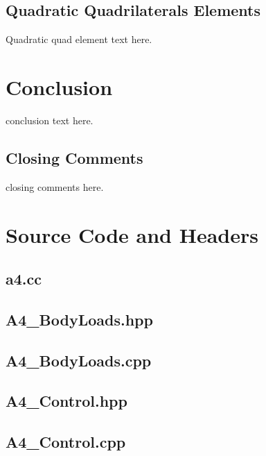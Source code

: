 \documentclass[a4paper, 12pt]{article}
\begin{document}
\subsection{Quadratic Quadrilaterals Elements} \label{subsec:quadQuads}
Quadratic quad element text here.

\section{Conclusion} \label{sec:conclusion}
conclusion text here.

\subsection{Closing Comments} \label{sec:comments}
closing comments here.

\newpage
\appendix
\section{Source Code and Headers} \label{sec:code}

\newpage
\subsection{a4.cc} \label{subsec:a4.cc}


\newpage
\subsection{A4\_BodyLoads.hpp} \label{subsec:BLhpp}


\newpage
\subsection{A4\_BodyLoads.cpp} \label{subsec:BLcpp}


\newpage
\subsection{A4\_Control.hpp} \label{subsec:Cont.hpp}


\newpage
\subsection{A4\_Control.cpp} \label{subsec:Cont.cpp}

\end{document}
